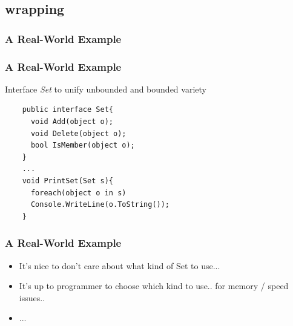 \documentclass{beamer}
\begin{document}
\subsection{wrapping}
\begin{frame}
  \frametitle{A Real-World Example}
\end{frame}

\begin{frame}[containsverbatim]
	\frametitle{A Real-World Example}
	Interface \textit{Set} to unify unbounded and bounded variety\\
	\begin{lstlisting}
	public interface Set{
      void Add(object o);
      void Delete(object o);
      bool IsMember(object o);
	}
    ...
    void PrintSet(Set s){
	  foreach(object o in s)
  	  Console.WriteLine(o.ToString());
	}	
	\end{lstlisting}
\end{frame}

\begin{frame}
  \frametitle{A Real-World Example}
  \begin{itemize}
	\item<+-> It's nice to don't care about what kind of Set to use... 
	\item<+-> It's up to programmer to choose which kind to use.. for memory / speed issues..
	\item<+-> ...
   \end{itemize}
\end{frame}
\end{document}
